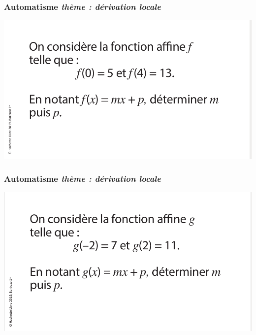 \documentclass[11pt]{beamer}
\newcounter{autocompteur}
\newcommand{\automatisme}[1]{\addtocounter{autocompteur}{1}\frametitle{Automatisme  \theautocompteur  \textit{ thème : #1}}}
\begin{document}
\begin{frame}
\automatisme{dérivation locale}

\begin{center}
\includegraphics[scale=0.3]{ressources/deriv_locale1.png}
\end{center}
\end{frame}




\begin{frame}
\automatisme{dérivation locale}

\begin{center}
\includegraphics[scale=0.3]{ressources/deriv_locale2.png}
\end{center}

\end{frame}
\end{document}
